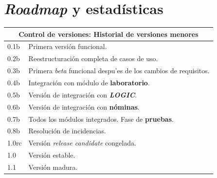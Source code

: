 \documentclass[a4paper]{article}
\begin{document}
    \section{\emph{Roadmap} y estadísticas}
        \begin{center}
            \begin{tabular}{|| l | l ||}
            \hline
            \hline
            \multicolumn{2}{c}{\textbf{Control de versiones: Historial de versiones menores}} \tabularnewline
            \hline
            0.1b & Primera versión funcional. \\
            \hline
            0.2b & Reestructuración completa de casos de uso. \\
            \hline
            0.3b & Primera \emph{beta} funcional despu'es de los cambios de requisitos. \\
            \hline
            0.4b & Integración con módulo de \textbf{laboratorio}. \\
            \hline
            0.5b & Versión de integración con \textbf{\emph{LOGIC}}. \\
            \hline
            0.6b & Versión de integración con \textbf{nóminas}. \\
            \hline
            0.7b & Todos los módulos integrados. Fase de \textbf{pruebas}. \\
            \hline
            \hline
            0.8b & Resolución de incidencias. \\
            \hline
            1.0rc & Versión \emph{release candidate} congelada. \\
            \hline
            1.0 & Versión estable. \\
            \hline
            1.1 & Versión madura. \\
            \hline
            \hline
            \end{tabular}
        \end{center}
\end{document}
